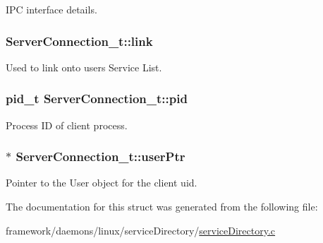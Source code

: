 I\+PC interface details. 

\subsubsection[{\texorpdfstring{link}{link}}]{ Server\+Connection\+\_\+t\+::link}\hypertarget{struct_server_connection__t_a31a05d4387cb8b71ce3c77630659aa04}{}\label{struct_server_connection__t_a31a05d4387cb8b71ce3c77630659aa04}


Used to link onto user\textquotesingle{}s Service List. 

\subsubsection[{\texorpdfstring{pid}{pid}}]{\setlength{\rightskip}{0pt plus 5cm}pid\+\_\+t Server\+Connection\+\_\+t\+::pid}\hypertarget{struct_server_connection__t_a0306c6e70546afd3029a91e8bad91742}{}\label{struct_server_connection__t_a0306c6e70546afd3029a91e8bad91742}


Process ID of client process. 

\subsubsection[{\texorpdfstring{user\+Ptr}{userPtr}}]{$\ast$ Server\+Connection\+\_\+t\+::user\+Ptr}\hypertarget{struct_server_connection__t_a097a2c382140d38225e5b04e62e18f77}{}\label{struct_server_connection__t_a097a2c382140d38225e5b04e62e18f77}


Pointer to the User object for the client uid. 



The documentation for this struct was generated from the following file\+:\begin{DoxyCompactItemize}
\item 
framework/daemons/linux/service\+Directory/\hyperlink{service_directory_8c}{service\+Directory.\+c}\end{DoxyCompactItemize}
